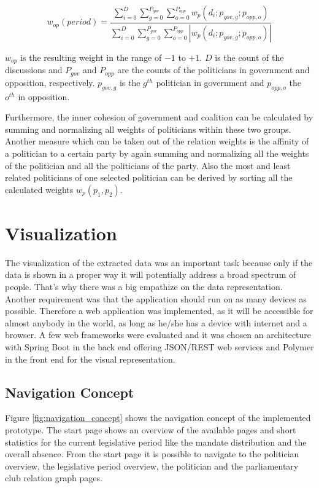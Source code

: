 $$
w_{op}(period) = \frac{\displaystyle\sum_{i=0}^{D} \displaystyle\sum_{g=0}^{P_{gov}} \displaystyle\sum_{o=0}^{P_{opp}} w_p(d_i;p_{gov,g};p_{opp,o})}{\displaystyle\sum_{i=0}^{D} \displaystyle\sum_{g=0}^{P_{gov}} \displaystyle\sum_{o=0}^{P_{opp}} |w_p(d_i;p_{gov,g};p_{opp,o})|}
$$

$w_{op}$ is the resulting weight in the range of $-1$ to $+1$. $D$ is the count of the discussions and $P_{gov}$ and $P_{opp}$ are the counts of the politicians in government and opposition, respectively. $p_{gov,g}$ is the $g^{th}$ politician in government and $p_{opp,o}$ the $o^{th}$ in opposition.

Furthermore, the inner cohesion of government and coalition can be calculated by summing and normalizing all weights of politicians within these two groups. Another measure which can be taken out of the relation weights is the affinity of a politician to a certain party by again summing and normalizing all the weights of the politician and all the politicians of the party. Also the most and least related politicians of one selected politician can be derived by sorting all the calculated weights $w_p(p_1,p_2)$.




\section{Visualization}
\label{sec:visualization}
The visualization of the extracted data was an important task because only if the data is shown in a proper way it will potentially address a broad spectrum of people. That's why there was a big empathize on the data representation. Another requirement was that the application should run on as many devices as possible. Therefore a web application was implemented, as it will be accessible for almost anybody in the world, as long as he/she has a device with internet and a browser. A few web frameworks were evaluated and it was chosen an architecture with Spring Boot in the back end offering JSON/REST web services and Polymer in the front end for the visual representation.


\subsection{Navigation Concept}
Figure \ref{fig:navigation_concept} shows the navigation concept of the implemented prototype. The start page shows an overview of the available pages and short statistics for the current legislative period like the mandate distribution and the overall absence. From the start page it is possible to navigate to the politician overview, the legislative period overview, the politician and the parliamentary club relation graph pages. 

